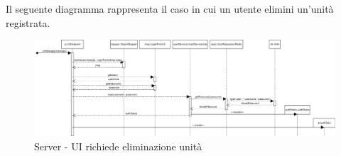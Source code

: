 Il seguente diagramma rappresenta il caso in cui un utente elimini un'unità registrata.
\begin{figure}[H]
	\centering
	\includegraphics[width=16cm]{img/server_seq3.png}
	\caption{Server - UI richiede eliminazione unità}
\end{figure}